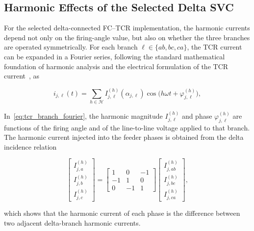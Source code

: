 \documentclass[journal]{IEEEtran}
\begin{document}
\subsection{Harmonic Effects of the Selected Delta SVC}
\label{subsec:svc_harmonics}

For the selected delta-connected FC--TCR implementation, the harmonic currents
depend not only on the firing-angle value, but also on whether the three
branches are operated symmetrically. For each branch
$\ell\in\{ab,bc,ca\}$, the TCR current can be
expanded in a Fourier series, following the standard mathematical foundation of
harmonic analysis and the electrical formulation of the TCR
current~\cite{katznelson2004introduction,MathurVarma2002}, as

\begin{equation}
    i_{j,\ell}(t)=\sum_{h\in\mathcal{H}}
    I_{j,\ell}^{(h)}(\alpha_{j,\ell})
    \cos\!\big(h\omega t+\varphi_{j,\ell}^{(h)}\big),
    \label{eq:tcr_branch_fourier}
\end{equation}

In~\eqref{eq:tcr_branch_fourier}, the harmonic magnitude
$I_{j,\ell}^{(h)}$ and phase
$\varphi_{j,\ell}^{(h)}$ are functions of the firing angle and of the
line-to-line voltage applied to that branch. The harmonic current injected
into the feeder phases is obtained from the delta incidence relation

\begin{equation}
    \begin{bmatrix}
    I_{j,a}^{(h)} \\
    I_{j,b}^{(h)} \\
    I_{j,c}^{(h)}
    \end{bmatrix}
    =
    \begin{bmatrix}
    1 & 0 & -1 \\
    -1 & 1 & 0 \\
    0 & -1 & 1
    \end{bmatrix}
    \begin{bmatrix}
    I_{j,ab}^{(h)} \\
    I_{j,bc}^{(h)} \\
    I_{j,ca}^{(h)}
    \end{bmatrix},
    \label{eq:delta_harmonic_currents}
\end{equation}

\noindent which shows that the harmonic current of each phase is the
difference between two adjacent delta-branch harmonic currents.
\end{document}
